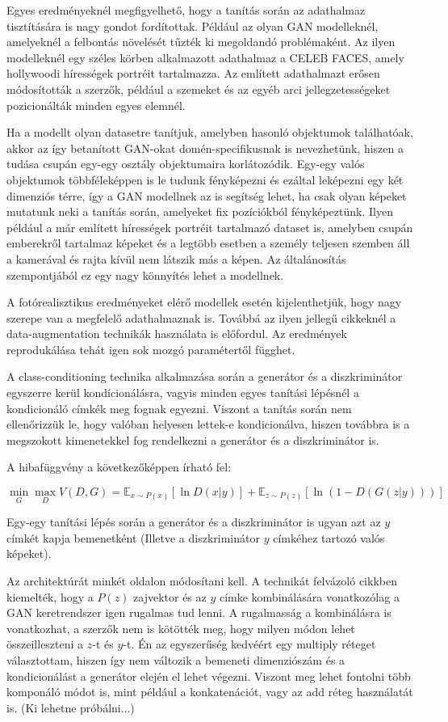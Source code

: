 Egyes eredményeknél megfigyelhető, hogy a tanítás során az adathalmaz tisztítására is nagy gondot fordítottak. Például az olyan GAN modelleknél, amelyeknél a felbontás növelését tűzték ki megoldandó problémaként. Az ilyen modelleknél egy széles körben alkalmazott adathalmaz a CELEB FACES, amely hollywoodi hírességek portréit tartalmazza. Az említett adathalmazt erősen módosították a szerzők, például a szemeket és az egyéb arci jellegzetességeket pozicionálták minden egyes elemnél.

Ha a modellt olyan datasetre tanítjuk, amelyben hasonló objektumok találhatóak, akkor az így betanított GAN-okat domén-specifikusnak is nevezhetünk, hiszen a tudása csupán egy-egy osztály objektumaira korlátozódik. Egy-egy valós objektumok többféleképpen is le tudunk fényképezni és ezáltal leképezni egy két dimenziós térre, így a GAN modellnek az is segítség lehet, ha csak olyan képeket mutatunk neki a tanítás során, amelyeket fix pozíciókból fényképeztünk.
Ilyen például a már említett hírességek portréit tartalmazó dataset is, amelyben csupán emberekről tartalmaz képeket és a legtöbb esetben a személy teljesen szemben áll a kamerával és rajta kívül nem látszik más a képen. Az általánosítás szempontjából ez egy nagy könnyítés lehet a modellnek.

A fotórealisztikus eredményeket elérő modellek esetén kijelenthetjük, hogy nagy szerepe van a megfelelő adathalmaznak is. Továbbá az ilyen jellegű cikkeknél a data-augmentation technikák használata is előfordul. Az eredmények reprodukálása tehát igen sok mozgó paramétertől függhet.

A class-conditioning technika alkalmazása során a generátor és a diszkriminátor egyszerre kerül kondícionálásra, vagyis minden egyes tanítási lépésnél a kondicionáló címkék meg fognak egyezni. Viszont a tanítás során nem ellenőrizzük le, hogy valóban helyesen lettek-e kondicionálva, hiszen továbbra is a megszokott kimenetekkel fog rendelkezni a generátor és a diszkriminátor is.

A hibafüggvény a következőképpen írható fel:

$$\min_{G}\max_{D}V(D, G) =  \mathbb{E}_{x \sim P(x)} \left[\ln D(x|y) \right] + \mathbb{E}_{z \sim P(z)} \left[\ln(1 - D(G(z|y))) \right]$$

Egy-egy tanítási lépés során a generátor és a diszkriminátor is ugyan azt az $y$ címkét kapja bemenetként (Illetve a diszkriminátor $y$ címkéhez tartozó valós képeket).

Az architektúrát minkét oldalon módosítani kell. A technikát felvázoló cikkben \cite{mirza2014conditional} kiemelték, hogy a $P(z)$ zajvektor és az $y$ címke kombinálására vonatkozólag a GAN keretrendszer igen rugalmas tud lenni. A rugalmasság a kombinálásra is vonatkozhat, a szerzők nem is kötötték meg, hogy milyen módon lehet összeilleszteni a $z$-t és $y$-t. Én az egyszerűség kedvéért egy multiply réteget választottam, hiszen így nem változik a bemeneti dimenziószám és a kondicionálást a generátor elején el lehet végezni. Viszont meg lehet fontolni több komponáló módot is, mint például a konkatenációt, vagy az add réteg használatát is. (Ki lehetne próbálni...)

